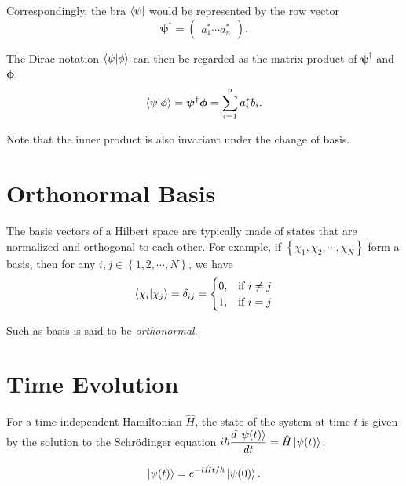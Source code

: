 \documentclass[class=report,crop=false]{standalone}
\begin{document}
Correspondingly, the bra $\bra{\psi}$ would be represented by the row vector
\begin{equation}
    \bm{\psi}^{\dagger} = \begin{pmatrix} a_1^* \cdots a_n^* \end{pmatrix}.
\end{equation}

The Dirac notation $\braket{\psi|\phi}$ can then be regarded as the matrix product of $\bm{\psi}^{\dagger}$ and $\bm{\phi}$:
\begin{equation}
    \braket{\psi|\phi} = \bm{\psi}^{\dagger}\bm{\phi} = \sum\limits_{i = 1}^{n} a_i^* b_i.
\end{equation}

Note that the inner product is also invariant under the change of basis.

\section*{Orthonormal Basis}
\addtocounter{section}{1}
\setcounter{equation}{0}

The basis vectors of a Hilbert space are typically made of states that are normalized and orthogonal to each other. For example, if $\left\{ \chi_1, \chi_2, \cdots, \chi_N \right\}$ form a basis, then for any $i, j \in \left\{ 1, 2, \cdots, N \right\}$, we have
\begin{equation}
    \braket{\chi_i | \chi_j} = \delta_{ij} = \begin{cases} \displaystyle 0, & \text{if } i \neq j \\ \displaystyle 1, & \text{if } i = j \end{cases}
\end{equation}

Such as basis is said to be \emph{orthonormal}.

\section*{Time Evolution}
\addtocounter{section}{1}
\setcounter{equation}{0}

For a time-independent Hamiltonian $\hat{H}$, the state of the system at time $t$ is given by the solution to the Schr{\"o}dinger equation $\displaystyle i\hbar \frac{d \ket{\psi(t)}}{dt} = \hat{H} \ket{\psi(t)}$:

\begin{equation}
    \Ket{\psi(t)} = e^{-i\hat{H}t / \hbar} \ket{\psi(0)}.
\end{equation}
\end{document}
